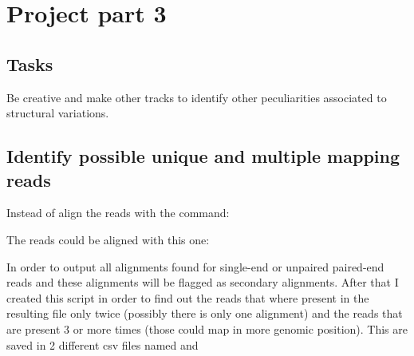 \chapter{Project part 3}

\section{Tasks}
Be creative and make other tracks to identify other peculiarities associated to
structural variations.

\section{Identify possible unique and multiple mapping reads}
Instead of align the reads with the command:

The reads could be aligned with this one:

In order to output all alignments found for single-end or unpaired paired-end
reads and these alignments will be flagged as secondary alignments.
After that I created this script in order to find out the reads that where
present in the resulting  file only twice (possibly there is only
one alignment) and the reads that are present 3 or more times (those could map
in more genomic position). This are saved in 2 different csv files named
 and 
